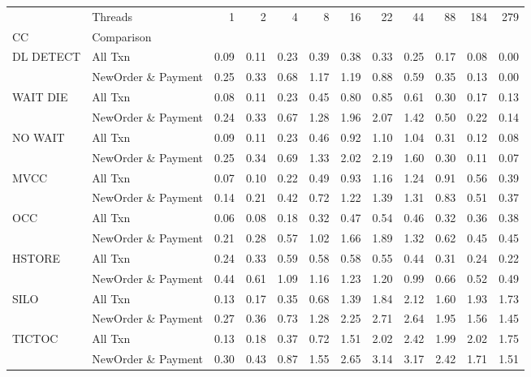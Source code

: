 \begin{tabular}{llrrrrrrrrrr}
\toprule
       & Threads &  1   &  2   &  4   &  8   &  16  &  22  &  44  &  88  &  184 &  279 \\
CC & Comparison &      &      &      &      &      &      &      &      &      &      \\
\midrule
DL DETECT & All Txn & 0.09 & 0.11 & 0.23 & 0.39 & 0.38 & 0.33 & 0.25 & 0.17 & 0.08 & 0.00 \\
       & NewOrder \& Payment & 0.25 & 0.33 & 0.68 & 1.17 & 1.19 & 0.88 & 0.59 & 0.35 & 0.13 & 0.00 \\
WAIT DIE & All Txn & 0.08 & 0.11 & 0.23 & 0.45 & 0.80 & 0.85 & 0.61 & 0.30 & 0.17 & 0.13 \\
       & NewOrder \& Payment & 0.24 & 0.33 & 0.67 & 1.28 & 1.96 & 2.07 & 1.42 & 0.50 & 0.22 & 0.14 \\
NO WAIT & All Txn & 0.09 & 0.11 & 0.23 & 0.46 & 0.92 & 1.10 & 1.04 & 0.31 & 0.12 & 0.08 \\
       & NewOrder \& Payment & 0.25 & 0.34 & 0.69 & 1.33 & 2.02 & 2.19 & 1.60 & 0.30 & 0.11 & 0.07 \\
MVCC & All Txn & 0.07 & 0.10 & 0.22 & 0.49 & 0.93 & 1.16 & 1.24 & 0.91 & 0.56 & 0.39 \\
       & NewOrder \& Payment & 0.14 & 0.21 & 0.42 & 0.72 & 1.22 & 1.39 & 1.31 & 0.83 & 0.51 & 0.37 \\
OCC & All Txn & 0.06 & 0.08 & 0.18 & 0.32 & 0.47 & 0.54 & 0.46 & 0.32 & 0.36 & 0.38 \\
       & NewOrder \& Payment & 0.21 & 0.28 & 0.57 & 1.02 & 1.66 & 1.89 & 1.32 & 0.62 & 0.45 & 0.45 \\
HSTORE & All Txn & 0.24 & 0.33 & 0.59 & 0.58 & 0.58 & 0.55 & 0.44 & 0.31 & 0.24 & 0.22 \\
       & NewOrder \& Payment & 0.44 & 0.61 & 1.09 & 1.16 & 1.23 & 1.20 & 0.99 & 0.66 & 0.52 & 0.49 \\
SILO & All Txn & 0.13 & 0.17 & 0.35 & 0.68 & 1.39 & 1.84 & 2.12 & 1.60 & 1.93 & 1.73 \\
       & NewOrder \& Payment & 0.27 & 0.36 & 0.73 & 1.28 & 2.25 & 2.71 & 2.64 & 1.95 & 1.56 & 1.45 \\
TICTOC & All Txn & 0.13 & 0.18 & 0.37 & 0.72 & 1.51 & 2.02 & 2.42 & 1.99 & 2.02 & 1.75 \\
       & NewOrder \& Payment & 0.30 & 0.43 & 0.87 & 1.55 & 2.65 & 3.14 & 3.17 & 2.42 & 1.71 & 1.51 \\
\bottomrule
\end{tabular}
